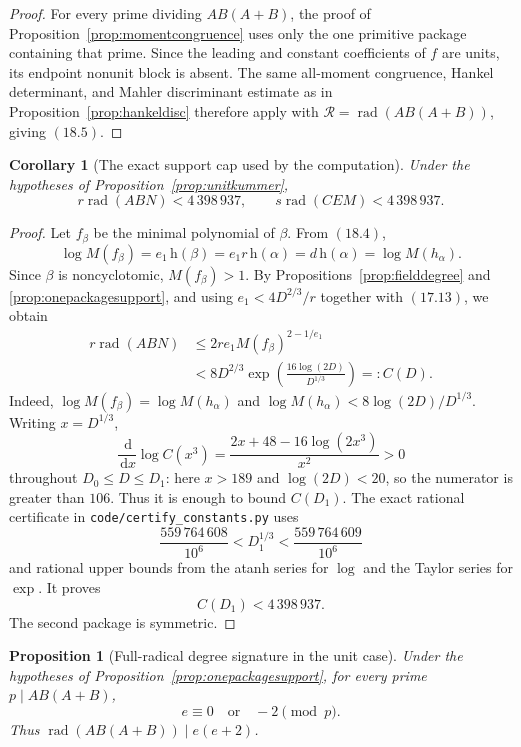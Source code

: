 \documentclass[11pt]{article}
\newtheorem{proposition}[theorem]{Proposition}
\newtheorem{corollary}[theorem]{Corollary}
\theoremstyle{definition}
\newcommand{\dd}{\,\mathrm d}
\begin{document}
\begin{proof}
For every prime dividing \(AB(A+B)\), the proof of
Proposition~\ref{prop:momentcongruence} uses only the one primitive package
containing that prime.  Since the leading and constant coefficients of \(f\)
are units, its endpoint nonunit block is absent.  The same all-moment
congruence, Hankel determinant, and Mahler discriminant estimate as in
Proposition~\ref{prop:hankeldisc} therefore apply with
\(\mathcal R=\operatorname{rad}(AB(A+B))\), giving \((18.5)\).
\end{proof}

\begin{corollary}[The exact support cap used by the computation]
\label{cor:unitsupportcap}
Under the hypotheses of Proposition~\ref{prop:unitkummer},
\begin{equation}
 r\operatorname{rad}(ABN)<4\,398\,937,
 \qquad
 s\operatorname{rad}(CEM)<4\,398\,937.
 \tag{18.6}
\end{equation}
\end{corollary}

\begin{proof}
Let \(f_\beta\) be the minimal polynomial of \(\beta\).  From \((18.4)\),
\[
 \log M(f_\beta)
 =e_1\,\mathrm h(\beta)
 =e_1r\,\mathrm h(\alpha)
 =d\,\mathrm h(\alpha)
 =\log M(h_\alpha).
\]
Since \(\beta\) is noncyclotomic, \(M(f_\beta)>1\).  By
Propositions~\ref{prop:fielddegree} and \ref{prop:onepackagesupport}, and
using \(e_1<4D^{2/3}/r\) together with \((17.13)\), we obtain
\[
 \begin{aligned}
 r\operatorname{rad}(ABN)
 &\leq2re_1M(f_\beta)^{2-1/e_1}\\
 &<8D^{2/3}
   \exp\!\left(\frac{16\log(2D)}{D^{1/3}}\right)
 =:C(D).
 \end{aligned}
\]
Indeed, \(\log M(f_\beta)=\log M(h_\alpha)\) and
\(\log M(h_\alpha)<8\log(2D)/D^{1/3}\).  Writing
\(x=D^{1/3}\),
\[
 \frac{\dd}{\dd x}\log C(x^3)
 =\frac{2x+48-16\log(2x^3)}{x^2}>0
\]
throughout \(D_0\leq D\leq D_1\): here \(x>189\) and
\(\log(2D)<20\), so the numerator is greater than \(106\).  Thus it is
enough to bound \(C(D_1)\).  The exact rational certificate in
\texttt{code/certify\_constants.py} uses
\[
 \frac{559\,764\,608}{10^6}<D_1^{1/3}
 <\frac{559\,764\,609}{10^6}
\]
and rational upper bounds from the atanh series for \(\log\) and the Taylor
series for \(\exp\).  It proves
\[
 C(D_1)<4\,398\,937.
\]
The second package is symmetric.
\end{proof}

\begin{proposition}[Full-radical degree signature in the unit case]
\label{prop:unitfullradical}
Under the hypotheses of Proposition~\ref{prop:onepackagesupport}, for every
prime \(p\mid AB(A+B)\),
\begin{equation}
 e\equiv0\quad\text{or}\quad-2\pmod p.
 \tag{18.7}
\end{equation}
Thus \(\operatorname{rad}(AB(A+B))\mid e(e+2)\).
\end{proposition}
\end{document}

